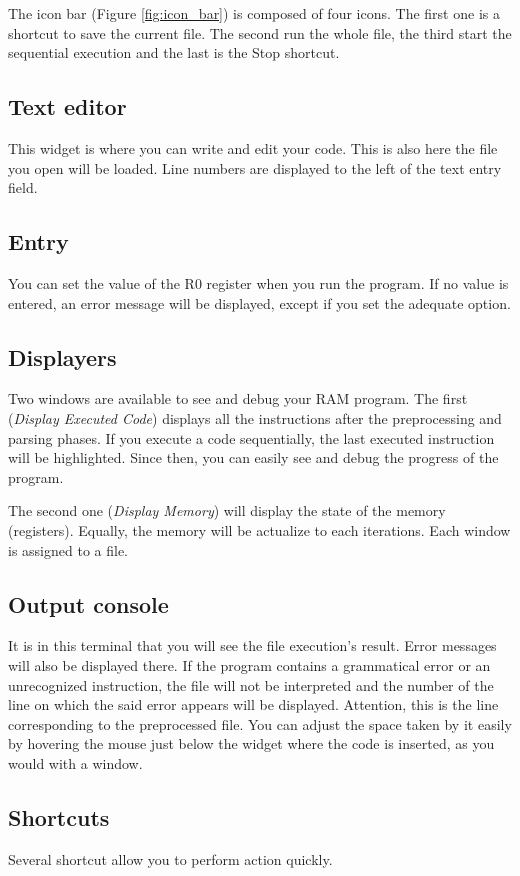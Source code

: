 The icon bar (Figure \ref{fig:icon_bar}) is composed of four icons. The first one is a shortcut to save the current file. The second run the whole file, the third start the sequential execution and the last is the Stop shortcut.

\subsection{Text editor}

This widget is where you can write and edit your code. This is also here the file you open will be loaded.
Line numbers are displayed to the left of the text entry field.

\subsection{Entry}

You can set the value of the R0 register when you run the program. If no value is entered, an error message will be displayed, except if you set the adequate option.
\subsection{Displayers}
Two windows are available to see and debug your RAM program. The first (\textit{Display Executed Code}) displays all the instructions after the preprocessing and parsing phases. If you execute a code sequentially, the last executed instruction will be highlighted. Since then, you can easily see and debug the progress of the program.

The second one (\textit{Display Memory}) will display the state of the memory (registers). Equally, the memory will be actualize to each iterations.
Each window is assigned to a file.
\subsection{Output console}
It is in this terminal that you will see the file execution's result. Error messages will also be displayed there.
If the program contains a grammatical error or an unrecognized instruction, the file will not be interpreted and the number of the line on which the said error appears will be displayed. Attention, this is the line corresponding to the preprocessed file.
You can adjust the space taken by it easily by hovering the mouse just below the widget where the code is inserted, as you would with a window.
\subsection{Shortcuts}
Several shortcut allow you to perform action quickly.

